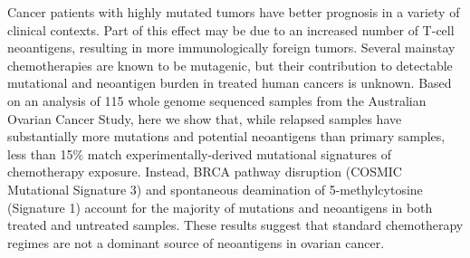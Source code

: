 Cancer patients with highly mutated tumors have better prognosis in a variety of clinical contexts. Part of this effect may be due to an increased number of T-cell neoantigens, resulting in more immunologically foreign tumors. Several mainstay chemotherapies are known to be mutagenic, but their contribution to detectable mutational and neoantigen burden in treated human cancers is unknown. Based on an analysis of 115 whole genome sequenced samples from the Australian Ovarian Cancer Study, here we show that, while relapsed samples have substantially more mutations and potential neoantigens than primary samples, less than 15\% match experimentally-derived mutational signatures of chemotherapy exposure. Instead, BRCA pathway disruption (COSMIC Mutational Signature 3) and spontaneous deamination of 5-methylcytosine (Signature 1) account for the majority of mutations and neoantigens in both treated and untreated samples. These results suggest that standard chemotherapy regimes are not a dominant source of neoantigens in ovarian cancer.

